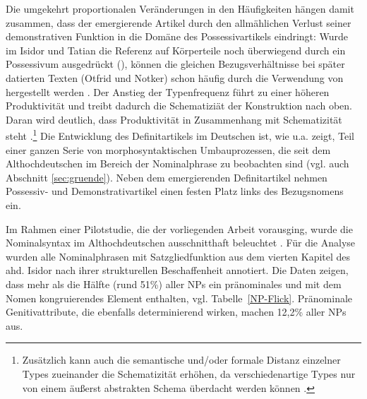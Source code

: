  
Die umgekehrt proportionalen Veränderungen in den Häufigkeiten hängen damit zusammen, dass der emergierende Artikel durch den allmählichen Verlust seiner demonstrativen Funktion in die Domäne des Possessivartikels eindringt: Wurde im Isidor und Tatian die Referenz auf Körperteile noch überwiegend durch ein Possessivum ausgedrückt (), können die gleichen Bezugsverhältnisse bei später datierten Texten (Otfrid und Notker) schon häufig durch die Verwendung von  hergestellt werden \parencite[z.B. , s.][186]{Oubouzar1997a}. Der Anstieg der Typenfrequenz führt zu einer höheren Produktivität \parencite[vgl.][]{Baayen2009,Bybee2013} und treibt dadurch die Schematiziät der Konstruktion nach oben. Daran wird deutlich, dass Produktivität in Zusammenhang mit Schematizität steht \parencite[][]{Baayen2009}.\footnote{Zusätzlich kann auch die semantische und/oder formale Distanz einzelner Types zueinander die Schematizität erhöhen, da verschiedenartige Types nur von einem äußerst abstrakten Schema überdacht werden können \parencite[37]{Barddal2015}.} Die Entwicklung des Definitartikels im Deutschen ist, wie u.a. \textcite{Demske2001} zeigt, Teil einer ganzen Serie von morphosyntaktischen Umbauprozessen, die seit dem Althochdeutschen im Bereich der Nominalphrase zu beobachten sind (vgl. auch Abschnitt \ref{sec:gruende}). Neben dem emergierenden Definitartikel nehmen Possessiv- und Demonstrativartikel einen festen Platz links des Bezugsnomens ein. 


Im Rahmen einer Pilotstudie, die der vorliegenden Arbeit vorausging, wurde die Nominalsyntax im Althochdeutschen ausschnitthaft beleuchtet \parencite{Flick2018}. Für die Analyse wurden alle Nominalphrasen mit Satzgliedfunktion aus dem vierten Kapitel des ahd. Isidor nach ihrer strukturellen Beschaffenheit annotiert. Die Daten zeigen, dass mehr als die Hälfte (rund 51\%) aller NPs ein pränominales und mit dem Nomen kongruierendes Element enthalten, vgl. Tabelle~\ref{NP-Flick}. Pränominale Genitivattribute, die ebenfalls determinierend wirken, machen 12,2\% aller NPs aus. 

